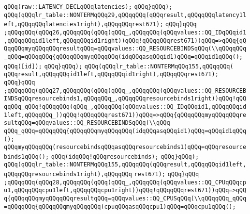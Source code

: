 \verb|qQQq(raw::LATENCY_DECLqQQqlatencies);|\newline
\verb|qQQq}qQQq);|\newline
\verb|qQQq(qQQqlr_table::NONTERMqQQq29,qQQqqQQq(qQQqresult,qQQqqQQqlatency1left,qQQqqQQqlatencies1right),qQQqqQQqrest671);|\newline
\verb|qQQq}qQQq|\newline
\verb|;qQQqqQQq(qQQq26,qQQqqQQq(qQQq(qQQq_,qQQqqQQq(qQQqvalues::QQ_IDqQQqid1,qQQqqQQqid1left,qQQqqQQqid1right))qQQq!qQQqqQQqrest671))qQQq=>qQQq{qQQqqQQqmyqQQqqQQqresultqQQq=qQQqvalues::QQ_RESOURCEBINDSqQQq(\\qQQqqQQq_qQQq=qQQqqQQq{qQQqqQQqmyqQQqqQQq(idqQQqasqQQqid1)qQQq=qQQqid1qQQq();|\newline
\verb|qQQq([id]);|\newline
\verb|qQQq}qQQq);|\newline
\verb|qQQq(qQQqlr_table::NONTERMqQQq155,qQQqqQQq(|\newline
\verb|qQQqresult,qQQqqQQqid1left,qQQqqQQqid1right),qQQqqQQqrest671);|\newline
\verb|qQQq}qQQq|\newline
\verb|;qQQqqQQq(qQQq27,qQQqqQQq(qQQq(qQQq_,qQQqqQQq(qQQqvalues::QQ_RESOURCEBINDSqQQqresourcebinds1,qQQqqQQq_,qQQqqQQqresourcebinds1right))qQQq!qQQqqQQq_qQQq!qQQqqQQq(qQQq_,qQQqqQQq(qQQqvalues::QQ_IDqQQqid1,qQQqqQQqid1left,qQQqqQQq_))qQQq!qQQqqQQqrest671))qQQq=>qQQq{qQQqqQQqmyqQQqqQQqresultqQQq=qQQqvalues::QQ_RESOURCEBINDSqQQq(\\qQQq|\newline
\verb|qQQq_qQQq=qQQqqQQq{qQQqqQQqmyqQQqqQQq(idqQQqasqQQqid1)qQQq=qQQqid1qQQq();|\newline
\verb|qQQqmyqQQqqQQq(resourcebindsqQQqasqQQqresourcebinds1)qQQq=qQQqresourcebinds1qQQq();|\newline
\verb|qQQq(idqQQq!qQQqresourcebinds);|\newline
\verb|qQQq}qQQq);|\newline
\verb|qQQq(qQQqlr_table::NONTERMqQQq155,qQQqqQQq(qQQqresult,qQQqqQQqid1left,qQQqqQQqresourcebinds1right),qQQqqQQq|\newline
\verb|rest671);|\newline
\verb|qQQq}qQQq|\newline
\verb|;qQQqqQQq(qQQq28,qQQqqQQq(qQQq(qQQq_,qQQqqQQq(qQQqvalues::QQ_CPUqQQqcpu1,qQQqqQQqcpu1left,qQQqqQQqcpu1right))qQQq!qQQqqQQqrest671))qQQq=>qQQq{qQQqqQQqmyqQQqqQQqresultqQQq=qQQqvalues::QQ_CPUSqQQq(\\qQQqqQQq_qQQq=qQQqqQQq{qQQqqQQqmyqQQqqQQq(cpuqQQqasqQQqcpu1)qQQq=qQQqcpu1qQQq();|\newline
